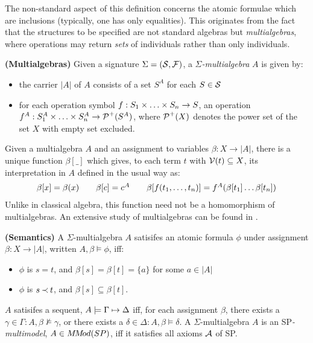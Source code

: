 The non-standard aspect of this definition concerns the atomic formulae which are
inclusions (typically, one has only equalities). This originates from the fact that
the structures to be specified are not standard algebras but {\em multialgebras},
where operations may return {\em sets} of individuals rather than only individuals.
%
\begin{DEFINITION} {\bf (Multialgebras)} \label{de:multialgebras}
Given a signature $\Sigma=(\Sorts,\Funcs)$, a {\em $\Sigma$-multialgebra} $A$
is given by:
\begin{itemize}\MyLPar
\item  the carrier $|A|$ of $A$ consists of a set $S^A$ for each $S\in\Sorts$
\item for each operation symbol $f: \List Sn\times \rightarrow S$, an operation
$f^A: \List {S^A}n\times \rightarrow \C P^+(S^A)$, where $\C P^+(X)$ denotes the 
power set of the set $X$ with empty set excluded.
\end{itemize}
\end{DEFINITION}
\noindent
Given a multialgebra $A$ and an assignment to variables $\beta:X\rightarrow |A|$, 
there is a unique function $\beta [\_]$ which gives, to each term $t$ 
with $\C V(t)\subseteq X$, its interpretation in $A$ defined in the usual way as:
\[ \begin{array}{ccccc} 
\beta [x] = \beta (x) & & \beta [c] = c^A
& & \beta [f(\List tn,)] = f^A(\beta[t_1]\ldots \beta[t_n]) 
\end{array} \]
Unlike in classical algebra, this function need not be a homomorphism of multialgebras.
An extensive study of multialgebras can be found in \cite{WB}.
%
\begin{DEFINITION} {\bf (Semantics)} \label{de:semantics}
A $\Sigma$-multialgebra $A$ satisifes an atomic formula $\phi$ under assignment
 $\beta:X\rightarrow |A|$, written $A,\beta\models \phi$, iff:
\begin{itemize}\MyLPar
\item $\phi$ is $s=t$, and $\beta[s]=\beta[t]=\{a\}$ for some $a\in |A|$
\item $\phi$ is $s\Incl t$, and $\beta[s]\subseteq\beta[t]$.
\end{itemize}
 $A$ satisifes a sequent, $A\models\Gamma\Seq\Delta$ iff,
for each assignment $\beta$, there exists a $\gamma\in\Gamma : A,\beta\not\models
\gamma$, or there exists a $\delta\in\Delta: A,\beta\models \delta$. 
A $\Sigma$-multialgebra $A$ is an SP{\em-multimodel}, $A\in \MMod(SP)$, iff it satisfies 
all axioms $\Ax$ of SP.
\end{DEFINITION}
